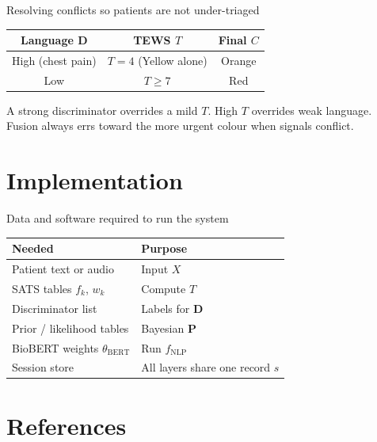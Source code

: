 \documentclass[aspectratio=169,11pt]{beamer}
\newcommand{\bcol}[2][blue!70!black]{\textcolor{#1}{#2}}
\begin{document}
\begin{frame}{Resolving conflicts so patients are not under-triaged}
	\begin{center}
		\small
		\begin{tabular}{@{}ccc@{}}
			\toprule
			\textbf{Language} $\mathbf{D}$ & \textbf{TEWS} $T$ & \textbf{Final $C$} \\
			\midrule
			High (chest pain) & $T=4$ (Yellow alone) & \bcol[triageOrange]{Orange} \\
			Low & $T \geq 7$ & \bcol[triageRed]{Red} \\
			\bottomrule
		\end{tabular}
	\end{center}

	\vspace{0.4em}
	A strong discriminator overrides a mild $T$. High $T$ overrides weak language. Fusion always errs toward the more urgent colour when signals conflict.
\end{frame}

\section{Implementation}

\begin{frame}{Data and software required to run the system}
	\small
	\begin{tabular}{@{}p{}p{}@{}}
		\toprule
		\textbf{Needed} & \textbf{Purpose} \\
		\midrule
		Patient text or audio & Input $X$ \\
		SATS tables $f_k$, $w_k$ & Compute $T$ \\
		Discriminator list & Labels for $\mathbf{D}$ \\
		Prior / likelihood tables & Bayesian $\mathbf{P}$ \\
		BioBERT weights $\theta_{\text{BERT}}$ & Run $f_{\text{NLP}}$ \\
		Session store & All layers share one record $s$ \\
		\bottomrule
	\end{tabular}
\end{frame}

\section{References}
\end{document}
